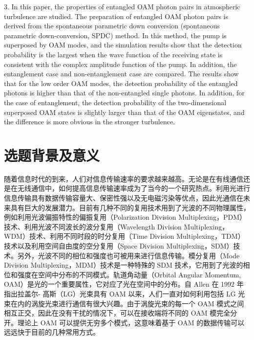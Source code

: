\documentclass[master]{thesis-uestc}
\begin{document}
\begin{englishabstract}
3. In this paper, the properties of entangled OAM photon pairs in atmospheric turbulence are studied. The preparation of entangled OAM photon pairs is derived from the spontaneous parametric down conversion (spontaneous parametric down-conversion, SPDC) method. In this method, the pump is superposed by OAM modes, and the simulation results show that the detection probability is the largest when the wave function of the receiving state is consistent with the complex amplitude function of the pump. In addition, the entanglement case and non-entanglement case are compared. The results show that for the low order OAM modes, the detection probability of the entangled photons is higher than that of the non-entangled single photons. In addition, for the case of entanglement, the detection probability of the two-dimensional superposed OAM states is slightly larger than that of the OAM eigenstates, and the difference is more obvious in the stronger turbulence.
\end{englishabstract}

\thesistableofcontents

\thesischapterexordium

\section{选题背景及意义}
随着信息时代的到来，人们对信息传输速率的要求越来越高。无论是在有线通信还是在无线通信中，如何提高信息传输速率成为了当今的一个研究热点。利用光进行信息传输具有数据传输容量大、保密性强以及无电磁污染等优点，因此光通信在未来具有巨大的发展潜力。目前有几种不同的复用技术用到了光波的不同物理属性，例如利用光波偏振特性的偏振复用（Polarization Division Multiplexing，PDM） 技术、利用光波不同波长的波分复用（Wavelength Division Multiplexing，WDM）技术、利用不同时段的时分复用（Time Division Multiplexing，TDM）技术以及利用空间自由度的空分复用（Space Division Multiplexing，SDM）技术。另外，光波不同的相位和强度也可被用来进行信息传输。模分复用（Mode Division Multiplexing，MDM）技术是一种特殊的 SDM 技术，它用到了光波的相位和强度在空间中分布的不同模式。轨道角动量（Orbital Angular Momentum, OAM）是光的一个重要属性，它对应了光在空间中的分布。自 Allen 在 1992 年指出拉盖尔- 高斯（LG）光束具有 OAM 以来，人们一直对如何利用包括 LG 光束在内的涡旋光束进行通信有很大兴趣。由于涡旋光束的每一个 OAM 模式之间相互正交，因此在没有干扰的情况下，可以在接收端将不同的 OAM 模完全分开。理论上 OAM 可以提供无穷多个模式，这意味着基于 OAM 的数据传输可以远远快于目前的几种常用方式。
\end{document}

